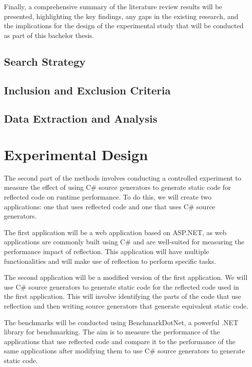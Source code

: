 Finally, a comprehensive summary of the literature review results will be presented, highlighting the key findings, any gaps in the existing research, and the implications for the design of the experimental study that will be conducted as part of this bachelor thesis.


\subsection{Search Strategy}

\subsection{Inclusion and Exclusion Criteria}

\subsection{Data Extraction and Analysis}


\section{Experimental Design}

The second part of the methods involves conducting a controlled experiment to measure the effect of using C\# source generators to generate static code for reflected code on runtime performance. To do this, we will create two applications: one that uses reflected code and one that uses C\# source generators.

The first application will be a web application based on ASP.NET, as web applications are commonly built using C\# and are well-suited for measuring the performance impact of reflection. This application will have multiple functionalities and will make use of reflection to perform specific tasks.

The second application will be a modified version of the first application. We will use C\# source generators to generate static code for the reflected code used in the first application. This will involve identifying the parts of the code that use reflection and then writing source generators that generate equivalent static code.

The benchmarks will be conducted using BenchmarkDotNet, a powerful .NET library for benchmarking. The aim is to measure the performance of the applications that use reflected code and compare it to the performance of the same applications after modifying them to use C\# source generators to generate static code.

